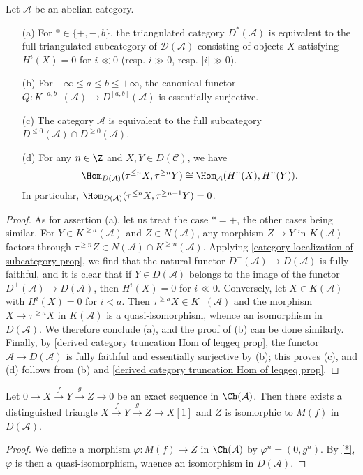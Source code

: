 \begin{proposition}\label{derived category truncation subcategory prop}
Let $\mathcal{A}$ be an abelian category.
\begin{enumerate}
    \item[(a)] For $\ast\in\{+,-,b\}$, the triangulated category $D^*(\mathcal{A})$ is equivalent to the full triangulated subcategory of $\mathcal{D}(\mathcal{A})$ consisting of objects $X$ satisfying $H^i(X)=0$ for $i\ll 0$ (resp. $i\gg 0$, resp. $|i|\gg 0$).
    \item[(b)] For $-\infty\leq a\leq b\leq+\infty$, the canonical functor $Q:K^{[a,b]}(\mathcal{A})\to D^{[a,b]}(\mathcal{A})$ is essentially surjective.
    \item[(c)] The category $\mathcal{A}$ is equivalent to the full subcategory $D^{\leq 0}(\mathcal{A})\cap D^{\geq 0}(\mathcal{A})$.
    \item[(d)] For any $n\in\Z$ and $X,Y\in D(\mathcal{C})$, we have 
    \[\Hom_{D(\mathcal{A})}(\tau^{\leq n}X,\tau^{\geq n}Y)\cong\Hom_{\mathcal{A}}(H^n(X),H^n(Y)).\]
    In particular, $\Hom_{D(\mathcal{A})}(\tau^{\leq n}X,\tau^{\geq n+1}Y)=0$. 
\end{enumerate}
\end{proposition}
\begin{proof}
As for assertion (a), let us treat the case $*=+$, the other cases being similar. For $Y\in K^{\geq a}(\mathcal{A})$ and $Z\in N(\mathcal{A})$, any morphism $Z\to Y$ in $K(\mathcal{A})$ factors through $\tau^{\geq n}Z\in N(\mathcal{A})\cap K^{\geq n}(\mathcal{A})$. Applying \cref{category localization of subcategory prop}, we find that the natural functor $D^+(\mathcal{A})\to D(\mathcal{A})$ is fully faithful, and it is clear that if $Y\in D(\mathcal{A})$ belongs to the image of the functor $D^+(\mathcal{A})\to D(\mathcal{A})$, then $H^i(X)=0$ for $i\ll 0$. Conversely, let $X\in K(\mathcal{A})$ with $H^i(X)=0$ for $i<a$. Then $\tau^{\geq a}X\in K^+(\mathcal{A})$ and the morphism $X\to\tau^{\geq a}X$ in $K(\mathcal{A})$ is a quasi-isomorphism, whence an isomorphism in $D(\mathcal{A})$. We therefore conclude (a), and the proof of (b) can be done similarly. Finally, by \cref{derived category truncation Hom of leqgeq prop}, the functor $\mathcal{A}\to D(\mathcal{A})$ is fully faithful and essentially surjective by (b); this proves (c), and (d) follows from (b) and \cref{derived category truncation Hom of leqgeq prop}.
\end{proof}

\begin{proposition}\label{derived category exact sequence is dt}
Let $0\to X\stackrel{f}{\to} Y\stackrel{g}{\to} Z\to 0$ be an exact sequence in $\Ch(\mathcal{A})$. Then there exists a distinguished triangle $X\stackrel{f}{\to} Y\stackrel{g}{\to} Z\to X[1]$ and $Z$ is isomorphic to $M(f)$ in $D(\mathcal{A})$.
\end{proposition}
\begin{proof}
We define a morphism $\varphi:M(f)\to Z$ in $\Ch(\mathcal{A})$ by $\varphi^n=(0,g^n)$. By \cref{*}, $\varphi$ is then a quasi-isomorphism, whence an isomorphism in $D(\mathcal{A})$.
\end{proof}


